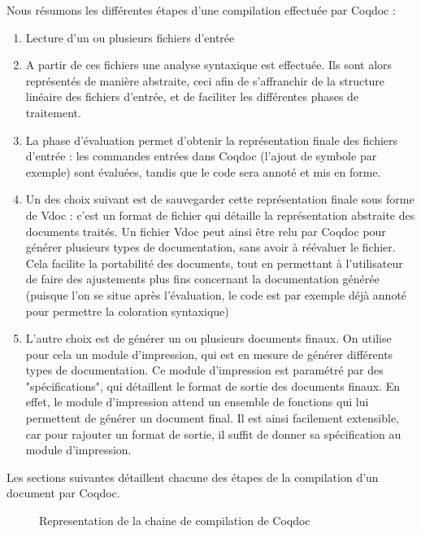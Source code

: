 \documentclass[a4paper, 11pt]{report}
\begin{document}
    Nous résumons les différentes étapes d'une compilation effectuée par
    Coqdoc :
    \begin{enumerate}
      \item Lecture d'un ou plusieurs fichiers d'entrée
      \item A partir de ces fichiers une analyse syntaxique est effectuée.
        Ils sont alors représentés de manière abstraite, ceci afin de
        s'affranchir de la structure linéaire des fichiers d'entrée, et de
        faciliter les différentes phases de traitement.
      \item La phase d'évaluation permet d'obtenir la représentation finale
        des fichiers d'entrée : les commandes entrées dans Coqdoc (l'ajout
        de symbole par exemple) sont évaluées, tandis que le code sera annoté
        et mis en forme.
      \item Un des choix suivant est de sauvegarder cette représentation
        finale sous forme de Vdoc : c'est un format de fichier qui détaille
        la représentation abstraite des documents traités.
        Un fichier Vdoc peut ainsi être relu par Coqdoc pour générer plusieurs
        types de documentation, sans avoir à réévaluer le fichier. Cela facilite
        la portabilité des documents, tout en permettant à l'utilisateur de faire
        des ajustements plus fins concernant la documentation générée (puisque
        l'on se situe après l'évaluation, le code est par exemple déjà annoté
        pour permettre la coloration syntaxique)
      \item L'autre choix est de générer un ou plusieurs documents finaux.
        On utilise pour cela un module d'impression, qui est en mesure de
        générer différents types de documentation.
        Ce module d'impression est paramétré par des "spécifications", qui
        détaillent le format de sortie des documents finaux. En effet, le
        module d'impression attend un ensemble de fonctions qui lui
        permettent de générer un document final.
        Il est ainsi facilement extensible, car pour rajouter un format de
        sortie, il suffit de donner sa spécification au module d'impression.
    \end{enumerate}

    Les sections suivantes détaillent chacune des étapes de la compilation
    d'un document par Coqdoc.
    \begin{figure}
      \caption{Representation de la chaine de compilation de Coqdoc}
      \label{fig:devchain}
    \end{figure}
\end{document}
